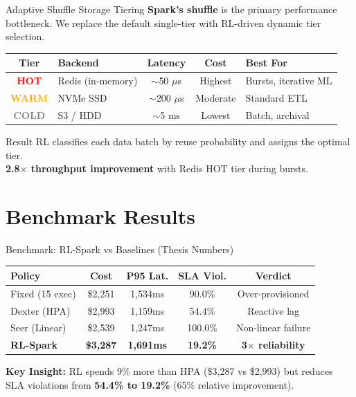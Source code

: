 \documentclass{beamer}
\begin{document}
\begin{frame}{Adaptive Shuffle Storage Tiering}
\textbf{Spark's shuffle} is the primary performance bottleneck. We replace the default single-tier with RL-driven dynamic tier selection.

\vspace{0.3cm}
\begin{table}[H]
\centering
\footnotesize
\begin{tabular}{|c|l|c|c|l|}
\hline
\textbf{Tier} & \textbf{Backend} & \textbf{Latency} & \textbf{Cost} & \textbf{Best For} \\
\hline
\textcolor{red}{\textbf{HOT}} & Redis (in-memory) & $\sim$50 $\mu$s & Highest & Bursts, iterative ML \\
\textcolor{orange}{\textbf{WARM}} & NVMe SSD & $\sim$200 $\mu$s & Moderate & Standard ETL \\
\textcolor{gray}{\textbf{COLD}} & S3 / HDD & $\sim$5 ms & Lowest & Batch, archival \\
\hline
\end{tabular}
\end{table}

\vspace{0.2cm}
\begin{exampleblock}{Result}
RL classifies each data batch by reuse probability and assigns the optimal tier.\\
\textbf{2.8$\times$ throughput improvement} with Redis HOT tier during bursts.
\end{exampleblock}
\end{frame}

\section{Benchmark Results}

\begin{frame}{Benchmark: RL-Spark vs Baselines (Thesis Numbers)}
\begin{table}[H]
\centering
\small
\begin{tabular}{|l|c|c|c|c|}
\hline
\textbf{Policy} & \textbf{Cost} & \textbf{P95 Lat.} & \textbf{SLA Viol.} & \textbf{Verdict} \\
\hline
Fixed (15 exec) & \$2,251 & 1,534ms & 90.0\% & Over-provisioned \\
Dexter (HPA) & \$2,993 & 1,159ms & 54.4\% & Reactive lag \\
Seer (Linear) & \$2,539 & 1,247ms & 100.0\% & Non-linear failure \\
\textbf{RL-Spark} & \textbf{\$3,287} & \textbf{1,691ms} & \textbf{19.2\%} & \textbf{3$\times$ reliability} \\
\hline
\end{tabular}
\end{table}
\vspace{0.2cm}
\textbf{Key Insight:} RL spends 9\% more than HPA (\$3,287 vs \$2,993) but reduces SLA violations from \textbf{54.4\% to 19.2\%} (65\% relative improvement).
\end{frame}
\end{document}
